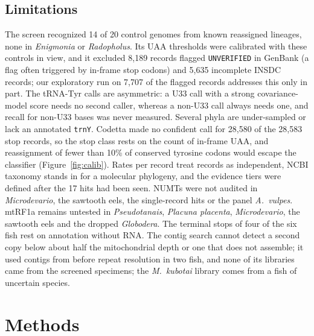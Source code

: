 \documentclass[11pt, a4paper]{article}
\begin{document}
\subsection{Limitations}
The screen recognized 14 of 20 control genomes from known reassigned lineages, none in \textit{Enigmonia} or \textit{Radopholus}. Its UAA thresholds were calibrated with these controls in view, and it excluded 8,189 records flagged \texttt{UNVERIFIED} in GenBank (a flag often triggered by in-frame stop codons) and 5,635 incomplete INSDC records; our exploratory run on 7,707 of the flagged records addresses this only in part. The tRNA-Tyr calls are asymmetric: a U33 call with a strong covariance-model score needs no second caller, whereas a non-U33 call always needs one, and recall for non-U33 bases was never measured. Several phyla are under-sampled or lack an annotated \texttt{trnY}. Codetta made no confident call for 28,580 of the 28,583 stop records, so the stop class rests on the count of in-frame UAA, and reassignment of fewer than 10\% of conserved tyrosine codons would escape the classifier (Figure~\ref{fig:calib}). Rates per record treat records as independent, NCBI taxonomy stands in for a molecular phylogeny, and the evidence tiers were defined after the 17 hits had been seen. NUMTs were not audited in \textit{Microdevario}, the sawtooth eels, the single-record hits or the panel \textit{A.\ vulpes}. mtRF1a remains untested in \textit{Pseudotanais}, \textit{Placuna placenta}, \textit{Microdevario}, the sawtooth eels and the dropped \textit{Globodera}. The terminal stops of four of the six fish rest on annotation without RNA. The contig search cannot detect a second copy below about half the mitochondrial depth or one that does not assemble; it used contigs from before repeat resolution in two fish, and none of its libraries came from the screened specimens; the \textit{M.\ kubotai} library comes from a fish of uncertain species.

\section{Methods}
\end{document}
